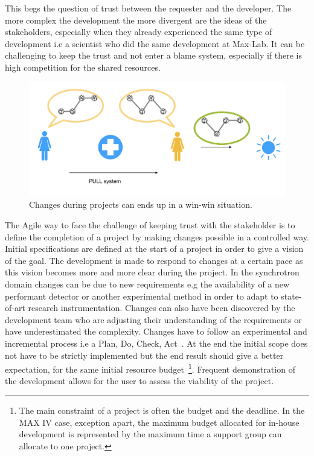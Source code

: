 \documentclass[a4paper,
              ]{jacow}
\begin{document}
This begs the question of trust between the requester and the developer. The more complex the development the more divergent are the ideas of the stakeholders, especially when they already experienced the same type of development i.e a scientist who did the same development at Max-Lab. It can be challenging to keep the trust and not enter a blame system, especially if there is high competition for the shared resources.

\begin{figure}[!tbh]
    \centering
    \includegraphics*[scale=0.3]{WEMPL008f4}
    \caption{Changes during projects can ends up in a win-win situation.}
    \label{WEMPL008f4}
\end{figure}

The Agile way to face the challenge of keeping trust with the stakeholder is to define the completion of a project by making changes possible in a controlled way. Initial specifications are defined at the start of a project in order to give a vision of the goal. The development is made to respond to changes at a certain pace as this vision becomes more and more clear during the project. 
In the synchrotron domain changes can be due to new requirements e.g the availability of a new performant detector or another experimental method in order to adapt to state-of-art research instrumentation. Changes can also have been discovered by the development team who are adjusting their understanding of the requirements or have underestimated the complexity. Changes have to follow an experimental and incremental process i.e a Plan, Do, Check, Act~\cite{pdca}.
At the end the initial scope does not have to be strictly implemented but the end result should give a better expectation, for the same initial resource budget~\footnote{The main constraint of a project is often the budget and the deadline. In the MAX IV case, exception apart, the maximum budget allocated for in-house development is represented by the maximum time a support group can allocate to one project.}. Frequent demonstration of the development allows for the user to assess the viability of the project.
\end{document}
